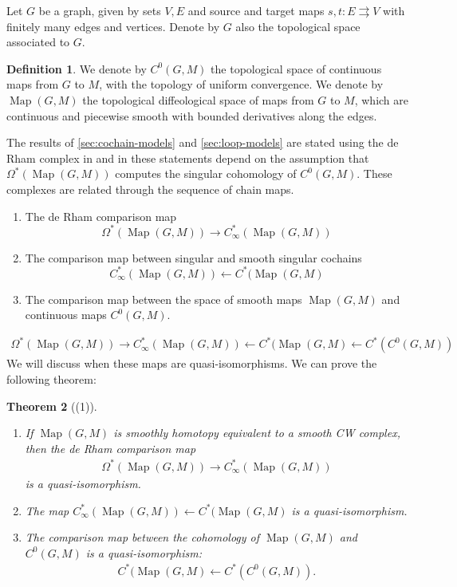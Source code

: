 \documentclass{scrartcl}
\theoremstyle{plain}
\newtheorem{theorem}{Theorem}[section]
\theoremstyle{definition}
\newtheorem{definition}[theorem]{Definition}
\newcommand{\from}{\leftarrow}
\DeclareMathOperator{\Map}{Map}
\begin{document}
Let $G$ be a graph, given by sets $V, E$ and source and target maps $s, t\colon E\rightrightarrows V$ with finitely many edges and vertices. Denote by $G$ also the topological space associated to $G$. 
\begin{definition}
    We denote by $C^0(G, M)$ the topological space of continuous maps from $G$ to $M$, with the topology of uniform convergence. We denote by $\Map(G, M)$ the topological diffeological space of maps from $G$ to $M$, which are continuous and piecewise smooth with bounded derivatives along the edges.
\end{definition}


The results of \cref{sec:cochain-models} and \cref{sec:loop-models} are stated using the de Rham complex in \cite{naef2019string} and in these statements depend on the assumption that $\Omega^*(\Map(G, M))$ computes the singular cohomology of $C^0(G, M)$. These complexes are related through the sequence of chain maps. 
\begin{enumerate}[(1)]
    \item The de Rham comparison map $$\Omega^*(\Map(G, M)) \to C_\infty^*(\Map(G, M))$$
    \item The comparison map between singular and smooth singular cochains $$C_\infty^*(\Map(G, M)) \from C^*(\Map(G, M)$$
    \item The comparison map between the space of smooth maps $\Map(G, M)$ and continuous maps $C^0(G, M)$.
\end{enumerate}
\begin{align}
    \Omega^*(\Map(G, M)) \to C_\infty^*(\Map(G, M)) \from C^*(\Map(G, M)\from C^*(C^0(G, M)) \label{eqn:diffeological-quisos}
\end{align}
We will discuss when these maps are quasi-isomorphisms. We can prove the following theorem: 
\begin{theorem}[(1)] \label{thm:diffeological-quiso-singular}
    \begin{enumerate}
    \item If $\Map(G, M)$ is smoothly homotopy equivalent to a smooth CW complex, then the de Rham comparison map 
    \begin{align*}
        \Omega^*(\Map(G, M)) \to C_\infty^*(\Map(G, M)) 
    \end{align*}
    is a quasi-isomorphism. 
    \item The map $C_\infty^*(\Map(G, M)) \from C^*(\Map(G, M)$ is a quasi-isomorphism.
    \item The comparison map between the cohomology of $\Map(G, M)$ and $C^0(G, M)$ is a quasi-isomorphism:
    \begin{align*}
        C^*(\Map(G, M)\from C^*(C^0(G, M)).
    \end{align*}
    \end{enumerate}
\end{theorem}
\end{document}
